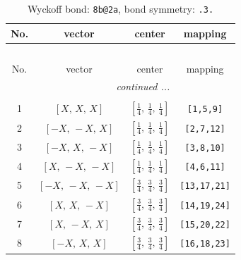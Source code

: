 \documentclass[fleqn,8pt]{jsarticle}
\begin{document}
\begin{longtable}{cccc}
\caption{Wyckoff bond: {\tt 8b@2a}, bond symmetry: {\tt .3.}}
 \\
 \hline \hline
No. & vector & center & mapping \\ \hline \endfirsthead

\multicolumn{3}{l}{\tablename\ \thetable{}} \\
 \hline \hline
No. & vector & center & mapping \\ \hline \endhead

 \hline \hline
\multicolumn{3}{r}{\footnotesize\it continued ...} \\ \endfoot

 \hline \hline
\multicolumn{3}{r}{} \\ \endlastfoot

1 & $\left[ X,\, X,\, X \right]$ & $\left[ \frac{1}{4},\, \frac{1}{4},\, \frac{1}{4} \right]$ & {\tt [1,5,9]} \\ \hline
2 & $\left[ - X,\, - X,\, X \right]$ & $\left[ \frac{1}{4},\, \frac{1}{4},\, \frac{1}{4} \right]$ & {\tt [2,7,12]} \\ \hline
3 & $\left[ - X,\, X,\, - X \right]$ & $\left[ \frac{1}{4},\, \frac{1}{4},\, \frac{1}{4} \right]$ & {\tt [3,8,10]} \\ \hline
4 & $\left[ X,\, - X,\, - X \right]$ & $\left[ \frac{1}{4},\, \frac{1}{4},\, \frac{1}{4} \right]$ & {\tt [4,6,11]} \\ \hline
5 & $\left[ - X,\, - X,\, - X \right]$ & $\left[ \frac{3}{4},\, \frac{3}{4},\, \frac{3}{4} \right]$ & {\tt [13,17,21]} \\ \hline
6 & $\left[ X,\, X,\, - X \right]$ & $\left[ \frac{3}{4},\, \frac{3}{4},\, \frac{3}{4} \right]$ & {\tt [14,19,24]} \\ \hline
7 & $\left[ X,\, - X,\, X \right]$ & $\left[ \frac{3}{4},\, \frac{3}{4},\, \frac{3}{4} \right]$ & {\tt [15,20,22]} \\ \hline
8 & $\left[ - X,\, X,\, X \right]$ & $\left[ \frac{3}{4},\, \frac{3}{4},\, \frac{3}{4} \right]$ & {\tt [16,18,23]} \\
\end{longtable}
\renewcommand{\arraystretch}{1.2}
\end{document}
